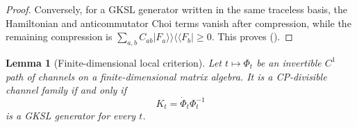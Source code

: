 \documentclass[twoside,10pt]{article}
\numberwithin{equation}{section}
\theoremstyle{slbody}
\newtheorem{lemma}[theorem]{Lemma}
\theoremstyle{definition}
\theoremstyle{remark}
\renewcommand{\eqref}[1]{%
  \textup{{\normalfont(\oldstylenums{\ref{#1}}}\normalfont)}}
\begin{document}
\begin{proof}
Conversely, for a GKSL generator written in the same traceless basis,
the Hamiltonian and anticommutator Choi terms vanish after compression,
while the remaining compression is
\(\sum_{a,b}C_{ab}|F_a\rangle\!\rangle
\langle\!\langle F_b|\geq0\).  This proves
\eqref{eq:compressed-choi-condition}.
\end{proof}

\begin{lemma}[Finite-dimensional local criterion]
\label{lem:local-divisibility}
Let \(t\mapsto\Phi_t\) be an invertible \(C^1\) path of channels on a
finite-dimensional matrix algebra.  It is a CP-divisible channel family
if and only if
\begin{equation}\label{eq:time-local-generator}
 K_t=\dot\Phi_t\Phi_t^{-1}
\end{equation}
is a GKSL generator for every \(t\).
\end{lemma}
\end{document}
